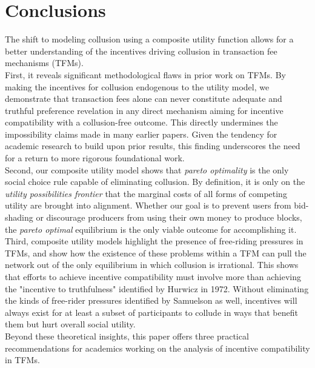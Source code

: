 \documentclass[11pt,a4paper]{llncs}
\begin{document}
\section*{Conclusions}

The shift to modeling collusion using a composite utility function allows for a better understanding of the incentives driving collusion in transaction fee mechanisms (TFMs).
\vspace{0.2cm} \\
First, it reveals significant methodological flaws in prior work on TFMs. By making the incentives for collusion endogenous to the utility model, we demonstrate that transaction fees alone can never constitute adequate and truthful preference revelation in any direct mechanism aiming for incentive compatibility with a collusion-free outcome. This directly undermines the impossibility claims made in many earlier papers. Given the tendency for academic research to build upon prior results, this finding underscores the need for a return to more rigorous foundational work.
\vspace{0.2cm} \\
Second, our composite utility model shows that \textit{pareto optimality} is the only social choice rule capable of eliminating collusion. By definition, it is only on the \textit{utility possibilities frontier} that the marginal costs of all forms of competing utility are brought into alignment. Whether our goal is to prevent users from bid-shading or discourage producers from using their own money to produce blocks, the \textit{pareto optimal} equilibrium is the only viable outcome for accomplishing it.
\vspace{0.2cm} \\
Third, composite utility models highlight the presence of free-riding pressures in TFMs, and show how the existence of these problems within a TFM can pull the network out of the only equilibrium in which collusion is irrational. This shows that efforts to achieve incentive compatibility must involve more than achieving the "incentive to truthfulness" identified by Hurwicz in 1972. Without eliminating the kinds of free-rider pressures identified by Samuelson as well, incentives will always exist for at least a subset of participants to collude in ways that benefit them but hurt overall social utility.
\vspace{0.2cm} \\
Beyond these theoretical insights, this paper offers three practical recommendations for academics working on the analysis of incentive compatibility in TFMs.
\end{document}
